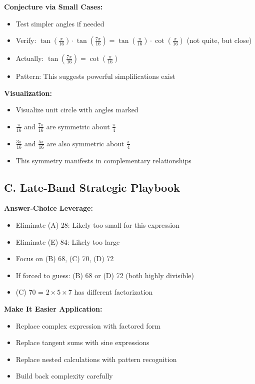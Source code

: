 \documentclass[12pt]{article}
\begin{document}
\begin{strategicbox}
\textbf{Conjecture via Small Cases:}
\begin{itemize}
    \item Test simpler angles if needed
    \item Verify: $\tan(\frac{\pi}{16}) \cdot \tan(\frac{7\pi}{16}) = \tan(\frac{\pi}{16}) \cdot \cot(\frac{\pi}{16})$ (not quite, but close)
    \item Actually: $\tan(\frac{7\pi}{16}) = \cot(\frac{\pi}{16})$
    \item Pattern: This suggests powerful simplifications exist
\end{itemize}

\textbf{Visualization:}
\begin{itemize}
    \item Visualize unit circle with angles marked
    \item $\frac{\pi}{16}$ and $\frac{7\pi}{16}$ are symmetric about $\frac{\pi}{4}$
    \item $\frac{3\pi}{16}$ and $\frac{5\pi}{16}$ are also symmetric about $\frac{\pi}{4}$
    \item This symmetry manifests in complementary relationships
\end{itemize}

\subsection*{C. Late-Band Strategic Playbook}

\textbf{Answer-Choice Leverage:}
\begin{itemize}
    \item Eliminate (A) 28: Likely too small for this expression
    \item Eliminate (E) 84: Likely too large
    \item Focus on (B) 68, (C) 70, (D) 72
    \item If forced to guess: (B) 68 or (D) 72 (both highly divisible)
    \item (C) 70 = $2 \times 5 \times 7$ has different factorization
\end{itemize}

\textbf{Make It Easier Application:}
\begin{itemize}
    \item Replace complex expression with factored form
    \item Replace tangent sums with sine expressions
    \item Replace nested calculations with pattern recognition
    \item Build back complexity carefully
\end{itemize}


\end{strategicbox}
\end{document}
